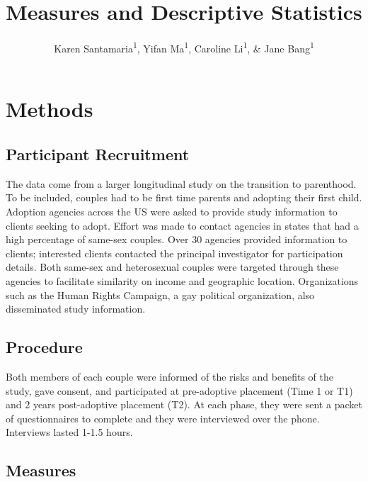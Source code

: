 \documentclass[man]{apa6}
\title{Measures and Descriptive Statistics}
\author{Karen Santamaria\textsuperscript{1}, Yifan Ma\textsuperscript{1}, Caroline Li\textsuperscript{1}, \& Jane Bang\textsuperscript{1}}
\date{}
\affiliation{
\vspace{0.5cm}
\textsuperscript{1} Smith College}
\begin{document}
\maketitle

\hypertarget{methods}{%
\section{Methods}\label{methods}}

\hypertarget{participant-recruitment}{%
\subsection{Participant Recruitment}\label{participant-recruitment}}

The data come from a larger longitudinal study on the transition to parenthood. To be included, couples had to be first time parents and adopting their first child. Adoption agencies across the US were asked to provide study information to clients seeking to adopt. Effort was made to contact agencies in states that had a high percentage of same-sex couples. Over 30 agencies provided information to clients; interested clients contacted the principal investigator for participation details. Both same-sex and heterosexual couples were targeted through these agencies to facilitate similarity on income and geographic location. Organizations such as the Human Rights Campaign, a gay political organization, also disseminated study information.

\hypertarget{procedure}{%
\subsection{Procedure}\label{procedure}}

Both members of each couple were informed of the risks and benefits of the study, gave consent, and participated at pre-adoptive placement (Time 1 or T1) and 2 years post-adoptive placement (T2). At each phase, they were sent a packet of questionnaires to complete and they were interviewed over the phone. Interviews lasted 1-1.5 hours.

\hypertarget{measures}{%
\subsection{Measures}\label{measures}}
\end{document}
